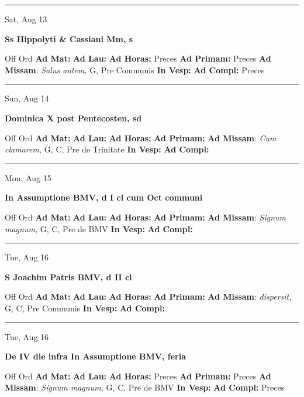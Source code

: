 \documentclass[letterpaper, 10pt]{article}
\begin{document}
\hrule
\begin{center}
Sat, Aug 13
\end{center}\textbf{ \large Ss Hippolyti \& Cassiani Mm, \textnormal{\normalsize s}}
\begin{justify}
Off Ord
\textbf{Ad Mat: }
\textbf{Ad Lau: }
\textbf{Ad Horas: }Preces
\textbf{Ad Primam: }Preces
\textbf{Ad Missam}: \textit{Salus autem,} G, Pre Communis
\textbf{In Vesp: }
\textbf{Ad Compl: }Preces\end{justify}



\hrule
\begin{center}
Sun, Aug 14
\end{center}\textbf{ \large Dominica X post Pentecosten, \textnormal{\normalsize sd}}
\begin{justify}
Off Ord
\textbf{Ad Mat: }
\textbf{Ad Lau: }
\textbf{Ad Horas: }
\textbf{Ad Primam: }
\textbf{Ad Missam}: \textit{Cum clamarem,} G, C, Pre de Trinitate
\textbf{In Vesp: }
\textbf{Ad Compl: }\end{justify}



\hrule
\begin{center}
Mon, Aug 15
\end{center}\textbf{ \large In Assumptione BMV, \textnormal{\normalsize d I cl cum Oct communi}}
\begin{justify}
Off Ord
\textbf{Ad Mat: }
\textbf{Ad Lau: }
\textbf{Ad Horas: }
\textbf{Ad Primam: }
\textbf{Ad Missam}: \textit{Signum magnum,} G, C, Pre de BMV
\textbf{In Vesp: }
\textbf{Ad Compl: }\end{justify}



\hrule
\begin{center}
Tue, Aug 16
\end{center}\textbf{ \large S Joachim Patris BMV, \textnormal{\normalsize d II cl}}
\begin{justify}
Off Ord
\textbf{Ad Mat: }
\textbf{Ad Lau: }
\textbf{Ad Horas: }
\textbf{Ad Primam: }
\textbf{Ad Missam}: \textit{dispersit,} G, C, Pre Communis
\textbf{In Vesp: }
\textbf{Ad Compl: }\end{justify}



\hrule
\begin{center}
Tue, Aug 16
\end{center}\textbf{ \large De IV die infra In Assumptione BMV, \textnormal{\normalsize feria}}
\begin{justify}
Off Ord
\textbf{Ad Mat: }
\textbf{Ad Lau: }
\textbf{Ad Horas: }Preces
\textbf{Ad Primam: }Preces
\textbf{Ad Missam}: \textit{Signum magnum,} G, C, Pre de BMV
\textbf{In Vesp: }
\textbf{Ad Compl: }Preces\end{justify}
\end{document}
